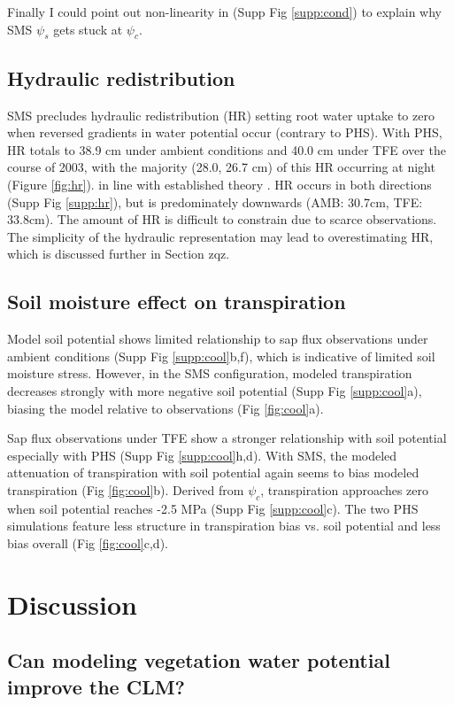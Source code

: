\documentclass[draft,linenumbers]{agujournal}
\begin{document}
Finally I could point out non-linearity in (Supp Fig \ref{supp:cond}) to explain why SMS $\psi_s$ gets stuck at $\psi_c$.

        
\subsection{Hydraulic redistribution}
    SMS precludes hydraulic redistribution (HR) setting root water uptake to zero when reversed gradients in water potential occur (contrary to PHS).
    With PHS, HR totals to 38.9 cm under ambient conditions and 40.0 cm under TFE over the course of 2003, with the majority (28.0, 26.7 cm) of this HR occurring at night (Figure \ref{fig:hr}).
    in line with established theory \citep{jackson2000}.
    HR occurs in both directions (Supp Fig \ref{supp:hr}), but is predominately downwards (AMB: 30.7cm, TFE: 33.8cm).
    The amount of HR is difficult to constrain due to scarce observations.
    The simplicity of the hydraulic representation may lead to overestimating HR, which is discussed further in Section zqz.

 
\subsection{Soil moisture effect on transpiration}    
    Model soil potential shows limited relationship to sap flux observations under ambient conditions (Supp Fig \ref{supp:cool}b,f), which is indicative of limited soil moisture stress.
    However, in the SMS configuration, modeled transpiration decreases strongly with more negative soil potential (Supp Fig \ref{supp:cool}a),
    biasing the model relative to observations (Fig \ref{fig:cool}a).
    
    Sap flux observations under TFE show a stronger relationship with soil potential especially with PHS (Supp Fig \ref{supp:cool}h,d).
    With SMS, the modeled attenuation of transpiration with soil potential again seems to bias modeled transpiration (Fig \ref{fig:cool}b).
    Derived from $\psi_c$, transpiration approaches zero when soil potential reaches -2.5 MPa (Supp Fig \ref{supp:cool}c).
    The two PHS simulations feature less structure in transpiration bias vs. soil potential and less bias overall (Fig \ref{fig:cool}c,d).
    
\section{Discussion}
\subsection{Can modeling vegetation water potential improve the CLM?}
\end{document}
